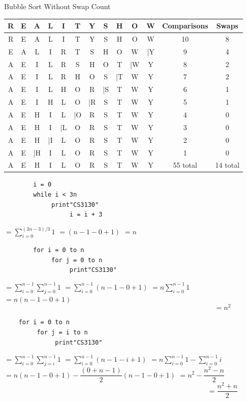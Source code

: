 \documentclass[12pt,largemargins]{homework}
\begin{document}
\begin{alphaparts}
		\item
	Bubble Sort Without Swap Count
		\begin{center}
		\begin{tabular}{c c c c c c c c c c c c c }
		\hline
		R & E & A & L & I & T & Y & S & H & O & W & Comparisons & Swaps\\
		\hline
		R & E & A & L & I & T & Y & S & H & O & W & 10 & 8\\
		\hline
		E & A & L & I & R & T & S & H & O & W & |Y & 9 &4\\
		\hline
		A & E & I & L & R & S & H & O & T & |W & Y & 8 & 2\\
		\hline
		A & E  & I & L & R & H & O & S & |T & W & Y & 7 & 2\\
		\hline
		A & E & I & L & H & O & R & |S & T & W & Y & 6 & 1\\
		\hline
		A & E & I & H & L & O & |R & S & T & W & Y & 5 & 1\\
		\hline
		A & E & H & I & L & |O & R & S & T & W & Y & 4 & 0\\
		\hline
		A & E & H & I & |L & O & R & S & T & W & Y & 3 & 0\\
		\hline
		A & E & H & |I & L & O & R & S & T & W & Y & 2 & 0\\
		\hline
		A & E & |H & I & L & O & R & S & T & W & Y & 1 & 0\\
		\hline
		A & E & H & I & L & O & R & S & T & W & Y & 55 total & 14 total \\
		\end{tabular}
	\end{center}
	\end{alphaparts}
	
\question
	\begin{alphaparts}
	\item
	\begin{verbatim}
		i = 0
		while i < 3n
		     print"CS3130"
		          i = i + 3
	\end{verbatim}
		$=\sum_{i=0}^{(3n-3)/3} 1$
		$=(n-1-0+1)$ \large{$=n$}
	\item
		\begin{verbatim}
		for i = 0 to n
		     for j = 0 to n 
		          print"CS3130"
		\end{verbatim}
		$=\sum_{i=0}^{n-1} \sum_{j=0}^{n-1} 1$
		$=\sum_{i=0}^{n-1} (n-1-0+1)$
		$=n\sum_{i=0}^{n-1} 1 $\\
		$=n(n-1-0+1)$
		$$=n^2$$

\newpage
	\item
	\begin{verbatim}
	for i = 0 to n 
	     for j = i to n
	          print"CS3130"
	\end{verbatim}
	$=\sum_{i=0}^{n-1} \sum_{j=i}^{n-1} 1$
	$=\sum_{i=0}^{n-1} (n-1-i+1)$
	$=n\sum_{i=0}^{n-1} 1 - \sum_{i=0}^{n-1} i$\\
	$=n(n-1-0+1) - \dfrac{(0 + n-1)}{2} (n -1- 0+1)$
	$=n^2 - \dfrac{n^2 - n}{2}$ \\
	$$=\dfrac{n^2 + n}{2}$$

	\end{alphaparts}
	
\end{document}
